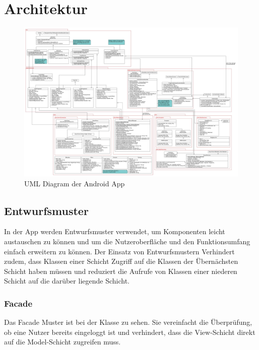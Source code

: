\section{Architektur}

\begin{figure}[ht]
	\centering
\includegraphics[width=1\textwidth]{./resources/Diagramme/App/UMLAndroidApp.jpg}
\caption{UML Diagram der Android App}
	\label{fig:modules_overview}
\end{figure}

\subsection{Entwurfsmuster}
In der App werden Entwurfsmuster verwendet, um Komponenten leicht austauschen zu können und um die Nutzeroberfläche und den Funktionsumfang einfach erweitern zu können. Der Einsatz von Entwurfsmustern Verhindert  zudem, dass Klassen einer Schicht Zugriff auf die Klassen der Übernächsten Schicht haben müssen und reduziert die Aufrufe von Klassen einer niederen Schicht auf die darüber liegende Schicht.

\subsubsection{Facade}
Das Facade Muster ist bei der Klasse  zu sehen. Sie vereinfacht die Überprüfung, ob eine Nutzer bereits eingeloggt ist und verhindert, dass die View-Schicht direkt auf die Model-Schicht zugreifen muss.

